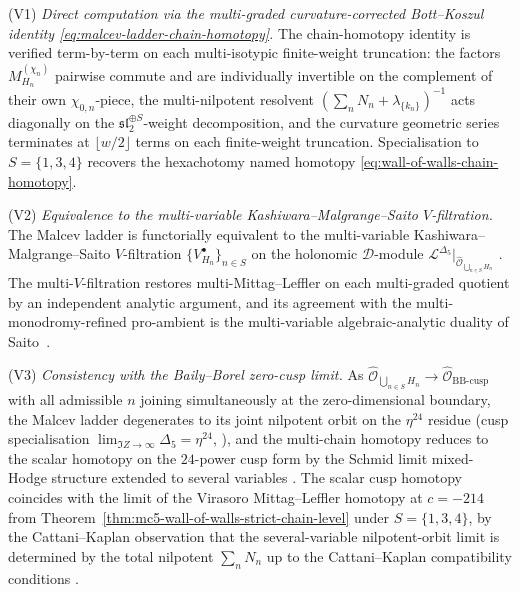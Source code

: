 \begin{remark}
\label{rem:three-verification-paths-malcev-ladder}
%
\textup{(V1)} \emph{Direct computation via the multi-graded
curvature-corrected Bott--Koszul identity
\textup{\eqref{eq:malcev-ladder-chain-homotopy}}.} The chain-homotopy
identity is verified term-by-term on each multi-isotypic finite-weight
truncation: the factors $M^{(\chi_n)}_{H_n}$ pairwise commute and are
individually invertible on the complement of their own
$\chi_{0,n}$-piece, the multi-nilpotent resolvent
$(\sum_n N_n+\lambda_{\{k_n\}})^{-1}$ acts diagonally on the
$\mathfrak{sl}_2^{\oplus S}$-weight decomposition, and the curvature
geometric series terminates at $\lfloor w/2\rfloor$ terms on each
finite-weight truncation. Specialisation to
$S=\{1,3,4\}$ recovers the hexachotomy named homotopy
\textup{\eqref{eq:wall-of-walls-chain-homotopy}}.

\textup{(V2)} \emph{Equivalence to the multi-variable
Kashiwara--Malgrange--Saito $V$-filtration.} The Malcev ladder is
functorially equivalent to the multi-variable
Kashiwara--Malgrange--Saito $V$-filtration
$\{V^\bullet_{H_n}\}_{n\in S}$ on the holonomic $\mathcal D$-module
$\mathcal L^{\Delta_5}|_{\widehat{\mathcal O}_{\bigcup_{n\in S}H_n}}$
\cite[Appendix~A]{SaitoMHM1988}. The multi-$V$-filtration restores
multi-Mittag--Leffler on each multi-graded quotient by an independent
analytic argument, and its agreement with the multi-monodromy-refined
pro-ambient is the multi-variable algebraic-analytic duality of
Saito~\cite[Thm.~A.3]{SaitoMHM1988}.

\textup{(V3)} \emph{Consistency with the Baily--Borel zero-cusp limit.}
As $\widehat{\mathcal O}_{\bigcup_{n\in S}H_n}\to
\widehat{\mathcal O}_{\mathrm{BB\text{-}cusp}}$ with all admissible $n$
joining simultaneously at the zero-dimensional boundary, the Malcev
ladder degenerates to its joint nilpotent orbit on the $\eta^{24}$
residue (cusp specialisation
$\lim_{\Im Z\to\infty}\Delta_5=\eta^{24}$,
\cite[\S 3]{GritsenkoNikulin1998}), and the multi-chain homotopy
reduces to the scalar homotopy on the $24$-power cusp form by the
Schmid limit mixed-Hodge structure \cite[\S 5]{Schmid1973} extended
to several variables \cite[\S 4]{CattaniKaplanSchmid1986}. The scalar
cusp homotopy coincides with the limit of the Virasoro
Mittag--Leffler homotopy at $c=-214$ from
Theorem~\textup{\ref{thm:mc5-wall-of-walls-strict-chain-level}} under
$S=\{1,3,4\}$, by the Cattani--Kaplan observation that the
several-variable nilpotent-orbit limit is determined by the total
nilpotent $\sum_n N_n$ up to the Cattani--Kaplan compatibility
conditions \cite[\S 2.1--\S 2.2]{CattaniKaplanSchmid1986}.
\end{remark}

